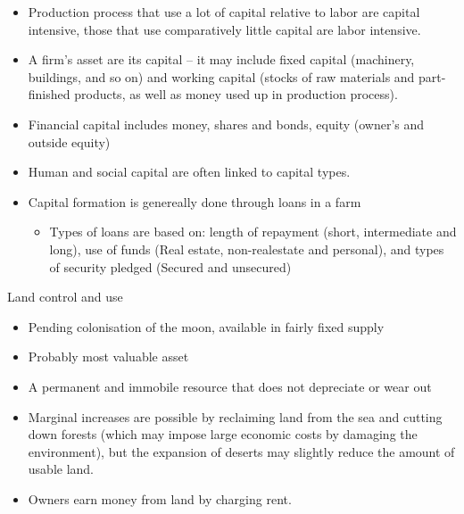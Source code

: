 \documentclass[12pt,ignorenonframetext,aspectratio=169]{beamer}
\providecommand{\tightlist}{%
  \setlength{\itemsep}{0pt}\setlength{\parskip}{0pt}}
\begin{document}
\begin{frame}{}
\protect\hypertarget{section-3}{}
\begin{itemize}
\tightlist
\item
  Production process that use a lot of capital relative to labor are
  capital intensive, those that use comparatively little capital are
  labor intensive.
\item
  A firm's asset are its capital -- it may include fixed capital
  (machinery, buildings, and so on) and working capital (stocks of raw
  materials and part-finished products, as well as money used up in
  production process).
\item
  Financial capital includes money, shares and bonds, equity (owner's
  and outside equity)
\item
  Human and social capital are often linked to capital types.
\item
  Capital formation is genereally done through loans in a farm

  \begin{itemize}
  \tightlist
  \item
    Types of loans are based on: length of repayment (short,
    intermediate and long), use of funds (Real estate, non-realestate
    and personal), and types of security pledged (Secured and unsecured)
  \end{itemize}
\end{itemize}
\end{frame}

\begin{frame}{Land control and use}
\protect\hypertarget{land-control-and-use}{}
\begin{itemize}
\tightlist
\item
  Pending colonisation of the moon, available in fairly fixed supply
\item
  Probably most valuable asset
\item
  A permanent and immobile resource that does not depreciate or wear out
\item
  Marginal increases are possible by reclaiming land from the sea and
  cutting down forests (which may impose large economic costs by
  damaging the environment), but the expansion of deserts may slightly
  reduce the amount of usable land.
\item
  Owners earn money from land by charging rent.
\end{itemize}
\end{frame}
\end{document}
